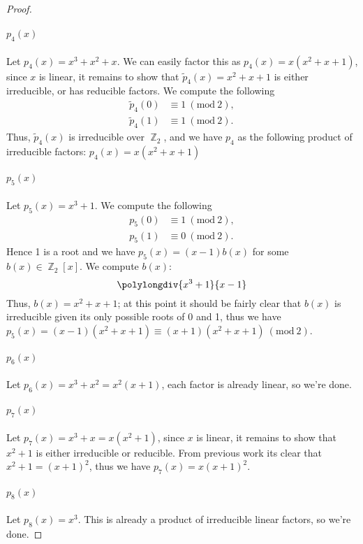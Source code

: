 \documentclass[letterpaper, 12pt]{amsart}
\DeclareMathOperator{\Z}{\mathbb{Z}}
\renewcommand{\mod}[1]{\ (\mathrm{mod}\ #1)}
\begin{document}
\begin{proof}
	\paragraph{$p_{4}(x)$}
	Let $p_{4}(x) = x^{3}+x^{2}+x$.
	We can easily factor this as $p_{4}(x) = x(x^{2} + x + 1)$, since $x$ is linear, it remains to show that $\tilde{p}_{4}(x) = x^{2} + x + 1$ is either irreducible, or has reducible factors.
	We compute the following
		\begin{align*}
		\tilde{p}_{4}(0) &\equiv 1 \mod{2}, \\
		\tilde{p}_{4}(1) &\equiv 1 \mod{2}.
		\end{align*}
	Thus, $\tilde{p}_{4}(x)$ is irreducible over $\Z_{2}$, and we have $p_{4}$ as the following product of irreducible factors: $p_{4}(x) = x(x^{2} + x + 1)$
	\vspace{5mm}

	\paragraph{$p_{5}(x)$}
	Let $p_{5}(x) = x^{3} + 1$.
	We compute the following
		\begin{align*}
		p_{5}(0) &\equiv 1 \mod{2}, \\
		p_{5}(1) &\equiv 0 \mod{2}.
		\end{align*}
	Hence 1 is a root and we have $p_{5}(x) = (x-1)b(x)$ for some $b(x) \in \Z_{2}[x]$.
	We compute $b(x)$: $$\polylongdiv{x^{3} + 1}{x - 1}$$
	Thus, $b(x) = x^{2} + x + 1$; at this point it should be fairly clear that $b(x)$ is irreducible given its only possible roots of 0 and 1, thus we have $p_{5}(x) = (x-1)(x^{2} + x + 1) \equiv (x+1)(x^{2} + x + 1) \mod{2}$.
	\vspace{5mm}

	\paragraph{$p_{6}(x)$}
	Let $p_{6}(x) = x^{3} + x^{2} = x^{2}(x + 1)$, each factor is already linear, so we're done.
	\vspace{5mm}

	\paragraph{$p_{7}(x)$}
	Let $p_{7}(x) = x^{3} + x = x(x^{2} + 1)$, since $x$ is linear, it remains to show that $x^{2} + 1$ is either irreducible or reducible.
	From previous work its clear that $x^{2} + 1 = (x+1)^{2}$, thus we have $p_{7}(x) = x(x+1)^{2}$.
	\vspace{5mm}

	\paragraph{$p_{8}(x)$}
	Let $p_{8}(x) = x^{3}$.
	This is already a product of irreducible linear factors, so we're done.
	\vspace{5mm}
	\end{proof}
\end{document}
